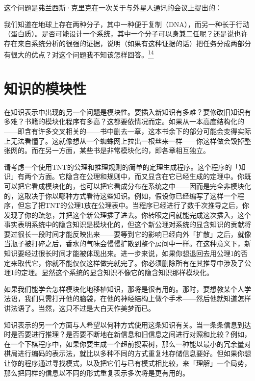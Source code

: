 \documentclass[
  12pt,
  twoside,
  openright,
  oldfontcommands,
]{memoir}
\newenvironment{fsquote}{%
  \begin{mdframed}[style=gebquote]\kaitifamily\small%
}{%
  \end{mdframed}%
}
\begin{document}
这个问题是弗兰西斯·克里克在一次关于与外星人通讯的会议上提出的：

\begin{fsquote}
我们知道在地球上存在两种分子，其中一种便于复制（DNA），而另一种长于行动（蛋白质）。是否可能设计一个系统，其中一个分子可以身兼二任呢？还是说也许存在来自系统分析的很强的证据，说明（如果有这种证据的话）把任务分成两部分有很大的优点？对这个问题我不知该怎样回答。\hyperref[fn:Chapter18-14]{\textsuperscript{14}}
\end{fsquote}

\section{知识的模块性}

在知识表示中出现的另一个问题是模块性。要插入新知识有多难？要修改旧知识有多难？书籍的模块化程序有多高？这都要依情况而定。如果从一本高度结构化的------即含有许多交叉相关的------书中删去一章，这本书余下的部分可能会变得实际上无法看懂了。这就像想从一个蜘蛛网上拉出一根丝来一样------你这样做会毁掉整张网的。而在另一方面，某些书是非常模块化的，即各章相互独立。

请考虑一个使用TNT的公理和推理规则的简单的定理生成程序。这个程序的「知识」有两个方面。它隐含在公理和规则中，而又显含在它已经生成的定理中。你既可以把它看成模块化的，也可以把它看成分布在系统之中------因而是完全非模块化的，这取决于你以哪种方式看待这些知识。例如，假设你已经编写了这样一个程序，但忘了把TNT的公理1放在公理表中。当程序已经进行了数千次推导之后，你发现了你的疏忽，并把这个新公理插了进去。你转眼之间就能完成这次插入，这个事实表明系统中的隐含知识是模块化的，但这个新公理对系统的显含知识的贡献将要过很长一段时间才能反映出来------要等到它的影响已经向外「扩散」之后，就像当瓶子被打碎之后，香水的气味会慢慢扩散到整个房间中一样。在这种意义下，新知识要经过很长时间才能被体现出来。进一步来说，如果你想退回去用公理1的否定来取代它，你就不能仅仅这样做完就完了。你必须删除所有在其推导中涉及了公理1的定理。显然这个系统的显含知识不像它的隐含知识那样模块化。

如果我们能学会怎样模块化地移植知识，那将是很有用的。那时，要想教某个人学法语，我们只需打开他的脑袋，在他的神经结构上做个手术------然后他就知道怎样讲法语了。当然，这只不过是大白天作美梦而已。

知识表示的另一个方面与人希望以何种方式使用这条知识有关。当一条条信息到达时是否要进行推理？是否要不断地在新信息和旧信息之间进行对照和比较？例如，在一个下棋程序中，如果你要生成一个超前搜索树，那么一种能以最小的冗余量对棋局进行编码的表示法，就比以多种不同的方式重复地存储信息要好。但如果你想让你的程序通过寻找模式，以及把它们与已有模式相比较，来「理解」一个局势，那么把同样的信息以不同的形式重复表示多次将是更有用的。
\end{document}

